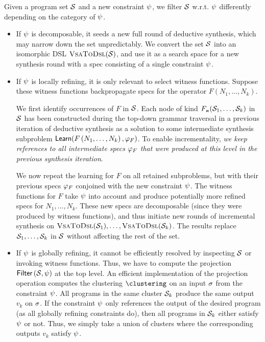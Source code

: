 Given a program set $\mathcal{S}$ and a new constraint $\psi$, we filter $\mathcal{S}$ w.r.t.
$\psi$ differently depending on the category of $\psi$.

\begin{itemize}
    \item If $\psi$ is decomposable, it seeds a new full round of deductive synthesis, which may narrow down the
        set unpredictably.
        We convert the set $\mathcal{S}$ into an isomorphic DSL $\text{\textsc{VsaToDsl}}(\mathcal{S})$, and use it as a search space
        for a new synthesis round with a spec consisting of a single constraint $\psi$.
    \item If $\psi$ is locally refining, it is only relevant to select witness functions.
        Suppose these witness functions backpropagate specs for the operator $F(N_1, \dots, N_k)$.

        We first identify occurrences of $F$ in $\mathcal{S}$.
        Each node of kind $F_{\text{\tiny\ensuremath{\Join}}}(\mathcal{S}_1, \dots, \mathcal{S}_k)$ in $\mathcal{S}$ has been constructed during the top-down grammar
        traversal in a previous iteration of deductive synthesis as a solution to some intermediate synthesis subproblem
        $\mathsf{Learn}(F\left(N_1, \dots, N_k\right), \varphi_F)$.
        To enable incrementality, \emph{we keep references to all intermediate specs $\varphi_F$ that were produced at
            this level in the previous synthesis iteration}.

        We now repeat the learning for $F$ on all retained subproblems, but with their previous specs $\varphi_F$
        conjoined with the new constraint $\psi$.
        The witness functions for $F$ take $\psi$ into account and produce potentially more refined specs for
        $N_1, \dots, N_k$.
        These new specs are decomposable (since they were produced by witness functions), and thus initiate new rounds
        of incremental synthesis on $\text{\textsc{VsaToDsl}}(\mathcal{S}_1), \dots, \text{\textsc{VsaToDsl}}(\mathcal{S}_k)$.
        The results replace $\mathcal{S}_1, \dots, \mathcal{S}_k$ in $\mathcal{S}$ without affecting the rest of the set.
    \item If $\psi$ is globally refining, it cannot be efficiently resolved by inspecting $\mathcal{S}$ or invoking
        witness functions.
        Thus, we have to compute the projection $\mathsf{Filter}\left(\mathcal{S}, \psi\right)$ at the top level.
        An efficient implementation of the projection operation computes the clustering $\clustering$ on an input
        $\sigma$ from the constraint $\psi$.
        All programs in the same cluster $\mathcal{S}_k$ produce the same output $v_k$ on $\sigma$.
        If the constraint $\psi$ only references the output of the desired program (as all globally refining
        constraints do), then all programs in $\mathcal{S}_k$ either satisfy $\psi$ or not.
        Thus, we simply take a union of clusters where the corresponding outputs $v_k$ satisfy $\psi$.


\end{itemize}
